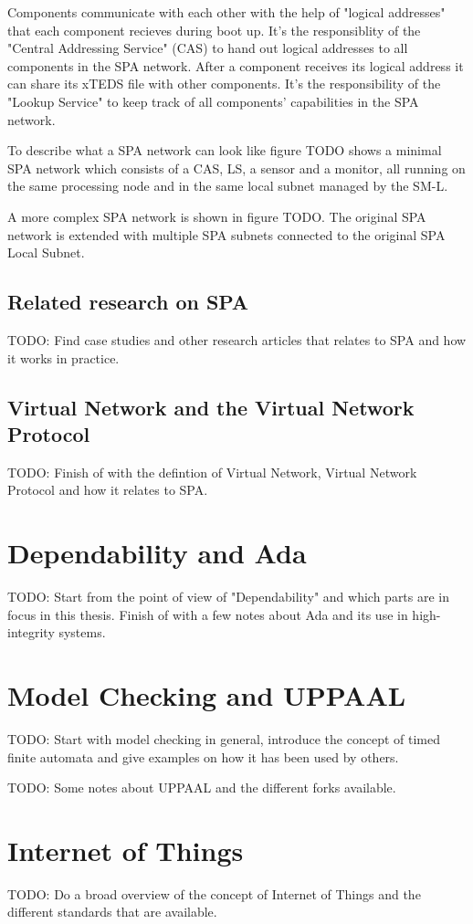 Components communicate with each other with the help of "logical addresses"
that each component recieves during boot up. It's the responsiblity of the
"Central Addressing Service" (CAS) to hand out logical addresses to all
components in the SPA network. After a component receives its logical address
it can share its xTEDS file with other components. It's the responsibility of
the "Lookup Service" to keep track of all components' capabilities in the SPA
network.

To describe what a SPA network can look like figure TODO shows a minimal SPA
network which consists of a CAS, LS, a sensor and a monitor, all running on the
same processing node and in the same local subnet managed by the SM-L.

A more complex SPA network is shown in figure TODO. The original SPA network is
extended with multiple SPA subnets connected to the original SPA Local Subnet.

\subsection{Related research on SPA}
TODO: Find case studies and other research articles that relates to SPA and how
it works in practice.

\subsection{Virtual Network and the Virtual Network Protocol}
TODO: Finish of with the defintion of Virtual Network, Virtual Network
Protocol and how it relates to SPA.

\section{Dependability and Ada}
TODO: Start from the point of view of "Dependability" and which parts are in
focus in this thesis. Finish of with a few notes about Ada and its use in
high-integrity systems.

\section{Model Checking and UPPAAL}
TODO: Start with model checking in general, introduce the concept of timed
finite automata and give examples on how it has been used by others.

TODO: Some notes about UPPAAL and the different forks available.

\section{Internet of Things}
TODO: Do a broad overview of the concept of Internet of Things and the
different standards that are available.
